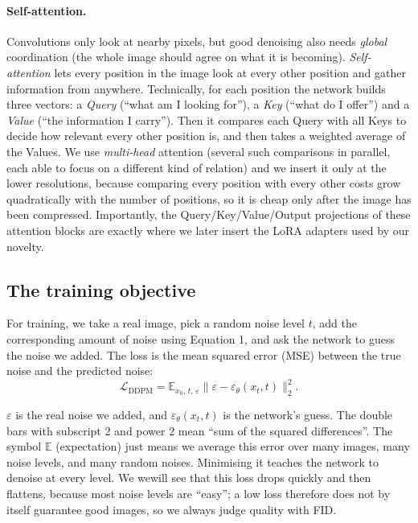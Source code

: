 \documentclass[11pt]{article}
\begin{document}
\paragraph{Self-attention.} Convolutions only look at nearby pixels, but good denoising
also needs \emph{global} coordination (the whole image should agree on what it is
becoming). \emph{Self-attention} lets every position in the image look at every other
position and gather information from anywhere. Technically, for each position the network
builds three vectors: a \emph{Query} (``what am I looking for''), a \emph{Key} (``what
do I offer'') and a \emph{Value} (``the information I carry''). Then it compares each Query with
all Keys to decide how relevant every other position is, and then takes a weighted average
of the Values. We use \emph{multi-head} attention (several such comparisons in parallel,
each able to focus on a different kind of relation) and we insert it only at the lower
resolutions, because comparing every position with every other costs grow quadratically
with the number of positions, so it is cheap only after the image has been compressed.
Importantly, the Query/Key/Value/Output projections of these attention blocks are exactly
where we later insert the LoRA adapters used by our novelty.

\subsection{The training objective}
For training, we take a real image, pick a random noise level $t$, add
the corresponding amount of noise using Equation 1, and ask the network to
guess the noise we added. The loss is the mean squared error (MSE) between the true noise
and the predicted noise:
\begin{equation}
  \mathcal{L}_{\mathrm{DDPM}} =
  \mathbb{E}_{x_0,\,t,\,\varepsilon}
  \big\| \varepsilon - \varepsilon_\theta(x_t, t) \big\|_2^2 .
  \label{eq:ddpm-loss}
\end{equation}

\noindent $\varepsilon$ is the real noise we added, and
$\varepsilon_\theta(x_t,t)$ is the network's guess. The double bars with subscript $2$ and
power $2$ mean ``sum of the squared differences''. The symbol $\mathbb{E}$ (expectation)
just means we average this error over many images, many noise levels, and many random
noises. Minimising it teaches the network to denoise at every level. We wewill see that
this loss drops quickly and then flattens, because most noise levels are ``easy''; a low
loss therefore does not by itself guarantee good images, so we always judge quality with
FID.
\end{document}
